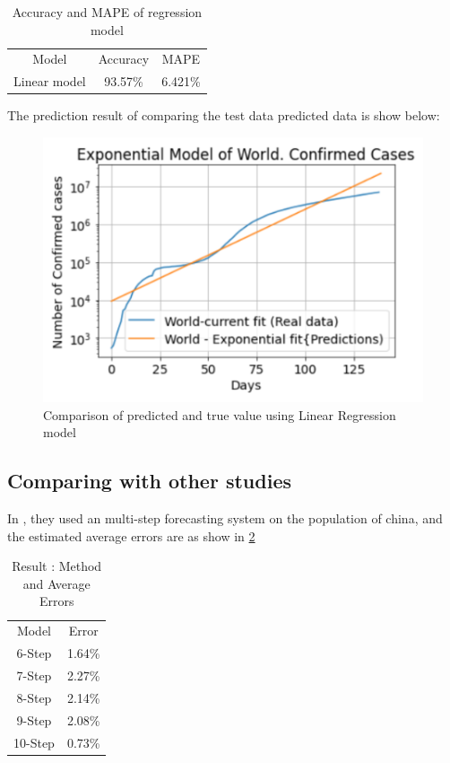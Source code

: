 \begin{table}[ht!]
	\centering
	\caption{Accuracy and MAPE of regression model}
	\begin{tabular}{c c c}
		Model & Accuracy & MAPE \\
		Linear model & 93.57\% & 6.421\%
	\end{tabular}
	\label{table:linear}
\end{table}

The prediction result of comparing the test data predicted data is show below:
\begin{figure}[ht!]
	\centering
	\includegraphics{images/linear_graph.png}
	\caption{Comparison of predicted and true value using Linear Regression model}
	\label{fig:linear_graph}
\end{figure}

\pagebreak

\subsection{Comparing with other studies}
%
In \cite{hu2020artificial}, they used an multi-step forecasting system on
the population of china, and the estimated average errors are as show in
\ref{table:three}

\begin{table}[ht!]
	\centering
	\caption{Result \cite{hu2020artificial}: Method and Average Errors}
	\begin{tabular}{c c }
		Model & Error  \\
		6-Step & 1.64\% \\
		7-Step & 2.27\% \\
		8-Step & 2.14\% \\
		9-Step & 2.08\% \\
		10-Step & 0.73\%
	\end{tabular}
	\label{table:three}
\end{table}


